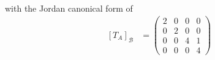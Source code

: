\documentclass[10pt]{mypackage}
\begin{document}
\begin{solution}
\begin{enumerate}[(a)]
\begin{align*}
      \end{align*}
      with the Jordan canonical form of
      \begin{align*}
        \left[T_A\right]_{\mathcal{B}} &= \begin{pmatrix}2 &0 &0 &0 \\ 0& 2 & 0&0 \\ 0& 0& 4 & 1 \\ 0& 0& 0& 4\end{pmatrix}
      \end{align*}
  \end{enumerate}
\end{solution}
\end{document}
